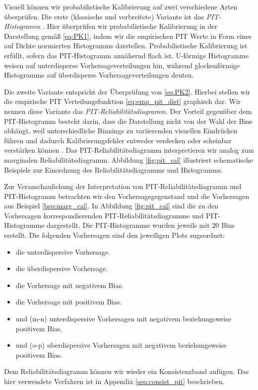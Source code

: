 Visuell können wir probabilistische Kalibrierung auf zwei verschiedene Arten überprüfen. Die erste (klassische und verbreitete) Variante ist das \emph{PIT-Histogramm} \parencite{gneiting2014probabilistic,gneitingCombining2013}. Hier überprüfen wir probabilistische Kalibrierung in der Darstellung gemäß \eqref{eq:PK1}, indem wir die empirischen PIT Werte in Form eines auf Dichte normierten Histogramms darstellen. Probabilistische Kalibrierung ist erfüllt, sofern das PIT-Histogramm annähernd flach ist. U-förmige Histogramme weisen auf unterdisperse Vorhersageverteilungen hin, während glockenförmige Histogramme auf überdisperse Vorhersageverteilungen deuten.

Die zweite Variante entspricht der Überprüfung von \eqref{eq:PK2}. Hierbei stellen wir die empirische PIT Verteilungsfunktion  \eqref{eq:emp_pit_dist} graphisch dar. Wir nennen diese Variante das \emph{PIT-Reliabilitätsdiagramm}. Der Vorteil gegenüber dem PIT-Histogramm besteht darin, dass die Darstellung nicht von der Wahl der Bins abhängt, weil unterschiedliche Binnings zu variierenden visuellen Eindrücken führen und dadurch Kalibrierungsfehler entweder verdecken oder scheinbar verstärken können \parencite{gneiting2023regression}. Das PIT-Reliabilitätsdiagramm interpretieren wir analog zum marginalen Reliabilitätsdiagramm. Abbildung \ref{fig:pit_cal} illustriert schematische Beispiele zur Einordnung des Reliabilitätsdiagramms und Histogramms.


\begin{bsp} \label{bsp:pit_cal}
Zur Veranschaulichung der Interpretation von PIT-Reliabilitäts\-diagramm und PIT-Histo\-gramm betrachten wir den Vorhersage\-gegenstand und die Vorhersagen aus Beispiel \ref{bsp:marg_cal}. In Abbildung \ref{fig:pit_cal} sind die zu den Vorhersagen korrespondierenden PIT-Reliabilitätsdiagramme und PIT-Histogramme dargestellt. Die PIT-Histogramme wurden jeweils mit $20$ Bins erstellt. Die folgenden Vorhersagen sind den jeweiligen Plots zugeordnet:
\begin{itemize}
\item[(a-b)] die unterdispersive Vorhersage.

\item[(c-d)] die überdispersive Vorhersage.

\item[(e-f)] die Vorhersage mit negativem Bias.

\item[(g-h)] die Vorhersage mit positivem Bias.

\item[(i-j)] und (m-n) unterdispersive Vorhersagen mit negativem beziehungsweise positivem Bias.

\item[(k-l)] und (o-p) uberdispersive Vorhersagen mit negativem beziehungsweise positivem Bias.

\end{itemize}
Dem Reliabilitätsdiagramm können wir wieder ein Konsistenzband anfügen. Das hier verwendete Verfahren ist in Appendix \ref{seq:consist_pit} beschrieben.
\end{bsp}

